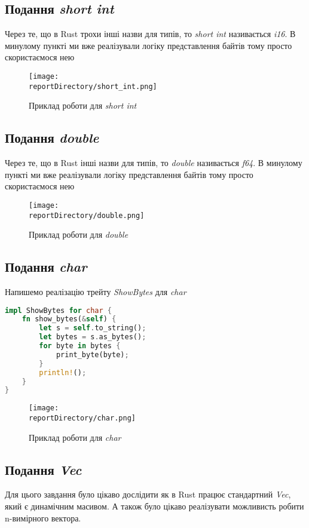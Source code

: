 \newpage
\subsection{Подання \textit{short int}}
Через те, що в Rust трохи інші назви для типів, то \textit{short int} називається \textit{i16}.
В минулому пункті ми вже реалізували логіку представлення байтів тому просто скористаємося нею

\begin{figure}[h!]
    \centering
    \texttt{[image: \\reportDirectory/short\_int.png]}
    \caption{Приклад роботи для \textit{short int}}
    \label{fig:task}
\end{figure}


\subsection{Подання \textit{double}}
Через те, що в Rust інші назви для типів, то \textit{double} називається \textit{f64}.
В минулому пункті ми вже реалізували логіку представлення байтів тому просто скористаємося нею

\begin{figure}[h!]
    \centering
    \texttt{[image: \\reportDirectory/double.png]}
    \caption{Приклад роботи для \textit{double}}
    \label{fig:task}
\end{figure}


\subsection{Подання \textit{char}}
Напишемо реалізацію трейту \textit{ShowBytes} для \textit{char}
\begin{lstlisting}[language=Rust, style=colouredRust]
impl ShowBytes for char {
    fn show_bytes(&self) {
        let s = self.to_string();
        let bytes = s.as_bytes();
        for byte in bytes {
            print_byte(byte);
        }
        println!();
    }
}
\end{lstlisting}

\begin{figure}[h!]
    \centering
    \texttt{[image: \\reportDirectory/char.png]}
    \caption{Приклад роботи для \textit{char}}
    \label{fig:task}
\end{figure}


\newpage
\subsection{Подання \textit{Vec}}
Для цього завдання було цікаво дослідити як в Rust працює стандартний \textit{Vec}, який є динамічним масивом.
А також було цікаво реалізувати можливисть робити n-вимірного вектора.

